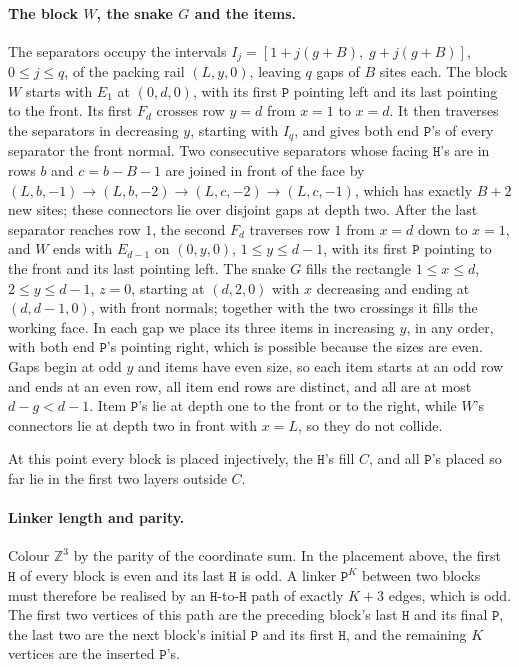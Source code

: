 \documentclass[11pt,letterpaper]{article}
\theoremstyle{definition}
\theoremstyle{remark}
\newcommand{\Hh}{\mathtt{H}}
\newcommand{\Pp}{\mathtt{P}}
\newcommand{\Z}{\mathbb{Z}}
\begin{document}
\paragraph{The block $W$, the snake $G$ and the items.}
The separators occupy the intervals $I_j=[1+j(g+B),\;g+j(g+B)]$, $0\le j\le q$, of the packing rail
$(L,y,0)$, leaving $q$ gaps of $B$ sites each. The block $W$ starts with $E_1$ at $(0,d,0)$, with its
first $\Pp$ pointing left and its last pointing to the front. Its first $F_d$ crosses row $y=d$ from
$x=1$ to $x=d$. It then traverses the separators in decreasing $y$, starting with $I_q$, and gives
both end $\Pp$'s of every separator the front normal. Two consecutive separators whose facing
$\Hh$'s are in rows $b$ and $c=b-B-1$ are joined in front of the face by
$(L,b,-1)\to(L,b,-2)\to(L,c,-2)\to(L,c,-1)$, which has exactly $B+2$ new sites; these connectors lie
over disjoint gaps at depth two. After the last separator reaches row $1$, the second $F_d$ traverses
row $1$ from $x=d$ down to $x=1$, and $W$ ends with $E_{d-1}$ on $(0,y,0)$, $1\le y\le d-1$, with its
first $\Pp$ pointing to the front and its last pointing left. The snake $G$ fills the rectangle
$1\le x\le d$, $2\le y\le d-1$, $z=0$, starting at $(d,2,0)$ with $x$ decreasing and ending at
$(d,d-1,0)$, with front normals; together with the two crossings it fills the working face. In each
gap we place its three items in increasing $y$, in any order, with both end $\Pp$'s pointing right,
which is possible because the sizes are even. Gaps begin at odd $y$ and items have even size, so each
item starts at an odd row and ends at an even row, all item end rows are distinct, and all are at
most $d-g<d-1$. Item $\Pp$'s lie at depth one to the front or to the right, while $W$'s connectors lie
at depth two in front with $x=L$, so they do not collide.

At this point every block is placed injectively, the $\Hh$'s fill $C$, and all $\Pp$'s placed so far lie in
the first two layers outside $C$.

\paragraph{Linker length and parity.}
Colour $\Z^3$ by the parity of the coordinate sum. In the placement above, the first $\Hh$ of every
block is even and its last $\Hh$ is odd. A linker $\Pp^K$ between two blocks must therefore be realised
by an $\Hh$-to-$\Hh$ path of exactly $K+3$ edges, which is odd. The first two vertices of this path are
the preceding block's last $\Hh$ and its final $\Pp$, the last two are the next block's initial $\Pp$
and its first $\Hh$, and the remaining $K$ vertices are the inserted $\Pp$'s.
\end{document}
